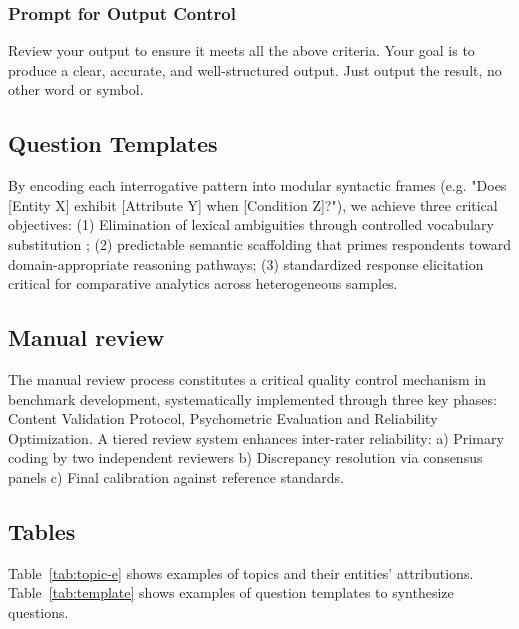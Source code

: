 \subsubsection{Prompt for Output Control}\label{appendix:output}
\begin{mdframed}
Review your output to ensure it meets all the above criteria. Your goal is to produce a clear, accurate, and well-structured output. Just output the result, no other word or symbol.
\end{mdframed}

\subsection{Question Templates}
By encoding each interrogative pattern into modular syntactic frames (e.g. "Does [Entity X] exhibit [Attribute Y] when [Condition Z]?"), we achieve three critical objectives: (1) Elimination of lexical ambiguities through controlled vocabulary substitution ; (2) predictable semantic scaffolding that primes respondents toward domain-appropriate reasoning pathways; (3) standardized response elicitation critical for comparative analytics across heterogeneous samples. 

\subsection{Manual review}
The manual review process constitutes a critical quality control mechanism in benchmark development, systematically implemented through three key phases: Content Validation Protocol, Psychometric Evaluation and Reliability Optimization. A tiered review system enhances inter-rater reliability: a) Primary coding by two independent reviewers b) Discrepancy resolution via consensus panels c) Final calibration against reference standards.

\subsection{Tables}
Table~\ref{tab:topic-e} shows examples of topics and their entities' attributions. Table~\ref{tab:template} shows examples of question templates to synthesize questions.

